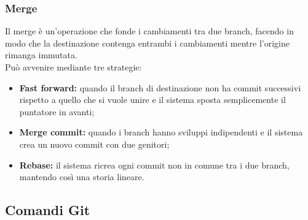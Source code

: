 \documentclass[12pt]{article}
\begin{document}
    \subsubsection{Merge}
    Il merge è un'operazione che fonde i cambiamenti tra due branch, facendo in modo che la destinazione contenga entrambi i cambiamenti mentre l'origine rimanga immutata.\\
    Può avvenire mediante tre strategie:
    \begin{itemize}
      \item \textbf{Fast forward:} quando il branch di destinazione non ha commit successivi rispetto a quello che si vuole unire e il sistema sposta semplicemente il puntatore in avanti;
      \item \textbf{Merge commit:} quando i branch hanno sviluppi indipendenti e il sistema crea un nuovo commit con due genitori;
      \item \textbf{Rebase:} il sistema ricrea ogni commit non in comune tra i due branch, mantendo così una storia lineare.
    \end{itemize}
  
    \subsection{Comandi Git}
    
\end{document}
